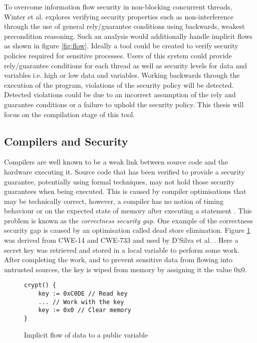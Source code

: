 To overcome information flow security in non-blocking concurrent threads, Winter et al. \cite{winter2020information} explores verifying security properties such as non-interference through the use of general rely/guarantee conditions using backwards, weakest precondition reasoning. Such an analysis would additionally handle implicit flows as shown in figure \ref{fig:flow}. Ideally a tool could be created to verify security policies required for sensitive processes. Users of this system could provide rely/guarantee conditions for each thread as well as security levels for data and variables i.e. high or low data and variables. Working backwards through the execution of the program, violations of the security policy will be detected. Detected violations could be due to an incorrect assumption of the rely and guarantee conditions or a failure to uphold the security policy. This thesis will focus on the compilation stage of this tool.

\subsection{Compilers and Security}
Compilers are well known to be a weak link between source code and the hardware executing it. Source code that has been verified to provide a security guarantee, potentially using formal techniques, may not hold those security guarantees when being executed. This is caused by compiler optimisations that may be technically correct, however, a compiler has no notion of timing behaviour or on the expected state of memory after executing a statement \cite{d2015correctness}. This problem is known as the \textit{correctness security gap}. One example of the correctness security gap is caused by an optimisation called dead store elimination. Figure \ref{fig:deadstore} was derived from CWE-14 \cite{cwe14} and CWE-733 \cite{cwe733} and used by D'Silva et al. \cite{d2015correctness}. Here a secret key was retrieved and stored in a local variable to perform some work. After completing the work, and to prevent sensitive data from flowing into untrusted sources, the key is wiped from memory by assigning it the value 0x0.

\begin{figure}
    \begin{lstlisting}
crypt() {
    key := 0xC0DE // Read key
    ... // Work with the key
    key := 0x0 // Clear memory
}
    \end{lstlisting}
    \caption{Implicit flow of data to a public variable \cite{d2015correctness}}
    \label{fig:deadstore}
\end{figure}

